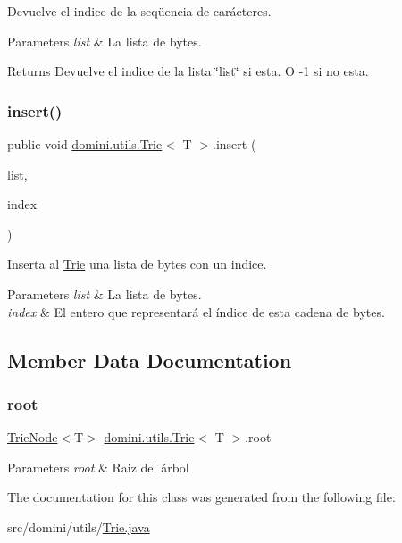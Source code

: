 Devuelve el indice de la seqüencia de carácteres. 


\begin{DoxyParams}{Parameters}
{\em list} & La lista de bytes. \\
\hline
\end{DoxyParams}
\begin{DoxyReturn}{Returns}
Devuelve el indice de la lista \char`\"{}list\char`\"{} si esta. O -\/1 si no esta. 
\end{DoxyReturn}
\mbox{\label{classdomini_1_1utils_1_1Trie_a3599001d9b056f0b54ab7eabb9d3510b}} 
\subsubsection{\texorpdfstring{insert()}{insert()}}
{\footnotesize\ttfamily public void \hyperlink{classdomini_1_1utils_1_1Trie}{domini.\+utils.\+Trie}$<$ T $>$.insert (\begin{DoxyParamCaption}\item[{Array\+List$<$ T $>$}]{list,  }\item[{Integer}]{index }\end{DoxyParamCaption})\hspace{0.3cm}{\ttfamily [inline]}}



Inserta al \hyperlink{classdomini_1_1utils_1_1Trie}{Trie} una lista de bytes con un indice. 


\begin{DoxyParams}{Parameters}
{\em list} & La lista de bytes. \\
\hline
{\em index} & El entero que representará el índice de esta cadena de bytes. \\
\hline
\end{DoxyParams}


\subsection{Member Data Documentation}
\mbox{\label{classdomini_1_1utils_1_1Trie_a60ef63a6c55d07710d33892ccc899bce}} 
\subsubsection{\texorpdfstring{root}{root}}
{\footnotesize\ttfamily \hyperlink{classdomini_1_1utils_1_1TrieNode}{Trie\+Node}$<$T$>$ \hyperlink{classdomini_1_1utils_1_1Trie}{domini.\+utils.\+Trie}$<$ T $>$.root\hspace{0.3cm}{\ttfamily [private]}}


\begin{DoxyParams}{Parameters}
{\em root} & Raiz del árbol \\
\hline
\end{DoxyParams}


The documentation for this class was generated from the following file\+:\begin{DoxyCompactItemize}
\item 
src/domini/utils/\hyperlink{Trie_8java}{Trie.\+java}\end{DoxyCompactItemize}
